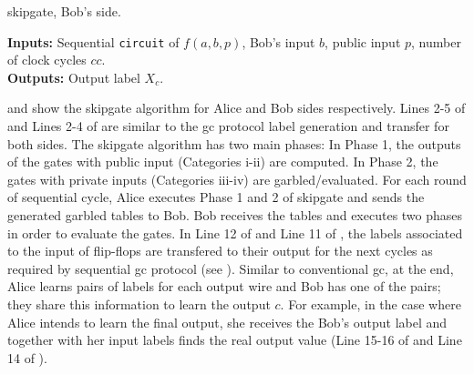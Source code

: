 \begin{algorithm}
\caption{\gls{skipgate}, Bob's side.}\label{alg:bob}
\textbf{Inputs:} Sequential \texttt{circuit} of $f(a,b,p)$, Bob's input $b$, public input $p$, number of clock cycles $cc$.\\
\textbf{Outputs:} Output label $X_c$.\\
\begin{algorithmic}[1]
\ENDFOR
{}
\end{algorithmic}
\end{algorithm}

 and  show the \gls{skipgate} algorithm for Alice and Bob sides respectively.
Lines 2-5 of  and Lines 2-4 of  are similar to the \acrshort{gc} protocol label generation and transfer for both sides.
The \gls{skipgate} algorithm has two main phases:
In Phase 1, the outputs of the gates with public input (Categories i-ii) are computed.
In Phase 2, the gates with private inputs (Categories iii-iv) are  garbled/evaluated.
For each round of sequential cycle, Alice executes Phase 1 and 2 of \gls{skipgate} and sends the generated garbled tables to Bob.
Bob receives the tables and executes two phases in order to evaluate the gates.
In Line 12 of  and Line 11 of , the labels associated to the input of flip-flops are transfered to their output for the next cycles as required by sequential \acrshort{gc} protocol (see ).
Similar to conventional \acrshort{gc}, at the end, Alice learns pairs of labels for each output wire and Bob has one of the pairs; they share this information to learn the output $c$.
For example, in the case where Alice intends to learn the final output, she receives the Bob's output label and together with her input labels finds the real output value (Line 15-16 of  and Line 14 of ).

